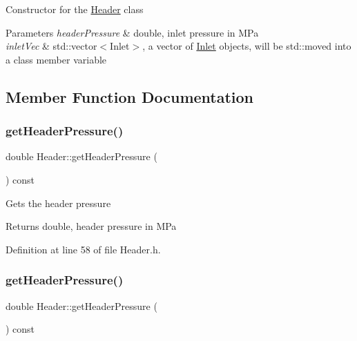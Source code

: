 Constructor for the \hyperlink{class_header}{Header} class


\begin{DoxyParams}{Parameters}
{\em header\+Pressure} & double, inlet pressure in M\+Pa \\
\hline
{\em inlet\+Vec} & std\+::vector$<$\+Inlet$>$, a vector of \hyperlink{class_inlet}{Inlet} objects, will be std\+::moved into a class member variable \\
\hline
\end{DoxyParams}


\subsection{Member Function Documentation}
\mbox{\label{class_header_adc2e6daaf9f5e633c3db96ff3990f1f6}} 
\subsubsection{\texorpdfstring{get\+Header\+Pressure()}{getHeaderPressure()}\hspace{0.1cm}{\footnotesize\ttfamily [1/3]}}
{\footnotesize\ttfamily double Header\+::get\+Header\+Pressure (\begin{DoxyParamCaption}{ }\end{DoxyParamCaption}) const\hspace{0.3cm}{\ttfamily [inline]}}

Gets the header pressure \begin{DoxyReturn}{Returns}
double, header pressure in M\+Pa 
\end{DoxyReturn}


Definition at line 58 of file Header.\+h.

\mbox{\label{class_header_adc2e6daaf9f5e633c3db96ff3990f1f6}} 
\subsubsection{\texorpdfstring{get\+Header\+Pressure()}{getHeaderPressure()}\hspace{0.1cm}{\footnotesize\ttfamily [2/3]}}
{\footnotesize\ttfamily double Header\+::get\+Header\+Pressure (\begin{DoxyParamCaption}{ }\end{DoxyParamCaption}) const\hspace{0.3cm}{\ttfamily [inline]}}

